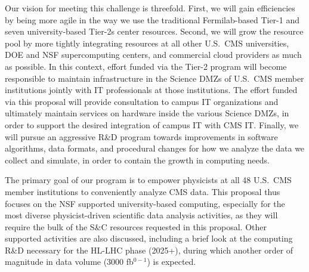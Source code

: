 \documentclass[11pt,a4paper]{article}
\begin{document}
Our vision for meeting this challenge 
is threefold. First, we will gain efficiencies by being  more
agile in the way we use the traditional Fermilab-based Tier-1 and seven
university-based Tier-2s center resources. Second, we will grow the
resource pool by more tightly integrating resources at all other
U.S.~CMS universities, DOE and NSF supercomputing centers, and
commercial cloud providers as much as possible. 
In this
context, effort funded via the Tier-2 program will become responsible to
maintain infrastructure in the Science DMZs of U.S.~CMS member institutions
jointly with IT professionals at those institutions.  The effort funded via
this proposal will provide consultation to campus IT organizations and
ultimately maintain services on hardware inside the various Science DMZs,
in order to support the desired integration of campus IT with CMS IT.
Finally, we will
pursue an aggressive R\&D program towards improvements in software
algorithms, data formats, and procedural changes for how we analyze
the data we collect and simulate, in order to contain the growth in
computing needs.





The primary goal of our program is to empower physicists at all 48 U.S.~CMS
member institutions to conveniently analyze CMS data. 
This proposal thus focuses on the NSF supported university-based computing,
especially for the most diverse %
physicist-driven scientific data analysis activities, as they will require
the bulk of the S\&C resources requested in this proposal.  Other supported
activities are also discussed, including a brief look at the
computing R\&D necessary for the HL-LHC phase (2025+), during which another
order of magnitude in data volume (3000 fb$^{0-1}$) is expected.
\end{document}
